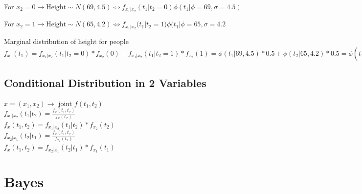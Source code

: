 \documentclass{article}
\begin{document}
{{{            For $x_2= 0 \rightarrow \text{Height} \sim N(69,4.5) \Leftrightarrow f_{x_1|x_2}(t_1|t_2= 0)\phi( t_1|\phi=69, \sigma= 4.5)$

            For $x_2= 1 \rightarrow \text{Height} \sim N(65,4.2)\Leftrightarrow f_{x_1|x_2}(t_1|t_2= 1)\phi( t_1|\phi=65, \sigma= 4.2$
            
            Marginal distribution of height for people
            \\ $f_{x_1}(t_1)=f_{x_1|x_2}(t_1|t_2= 0)*f_{x_2}(0)+f_{x_1|x_2}(t_1|t_2= 1)*f_{x_2}(1)= \phi(t_1|69, 4.5)*0.5+\phi(t_2|65, 4.2)*0.5= \phi(t_1|\frac{69+65}{2},\sqrt{\frac{4.5^2+4.2^2}{2}} )$
        } 
        
    }

    \subsection{Conditional Distribution in 2 Variables}{
        $x=(x_1, x_2) \rightarrow$ joint  $f(t_1,t_2)$
        \\$f_{x_1|x_2}(t_1|t_2)=\frac{ f_x(t_1,t_2)}{f_x(t_2)}$
        \\$f_x(t_1, t_2)=  f_{x_1|x_2}(t_1|t_2)*f_{x_2}(t_2)$
        \\$f_{x_2|x_1}(t_2|t_1)=\frac{ f_x(t_1,t_2)}{f_{x_1}(t_1)}$
        \\$f_x(t_1, t_2)=  f_{x_2|x_1}(t_2|t_1)*f_{x_1}(t_1)$
    }
}

\section{Bayes} 
\end{document}
